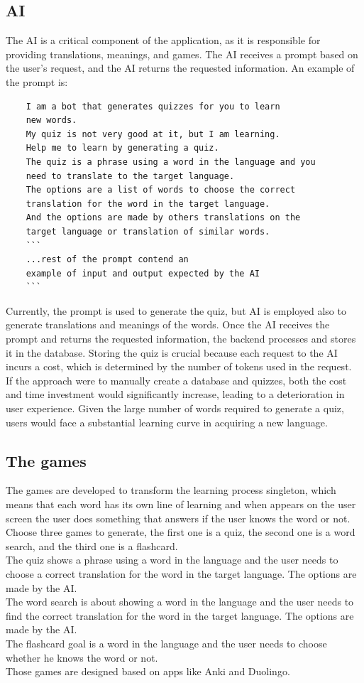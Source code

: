 \documentclass[12pt]{article}
\begin{document}
\subsection{AI}
  The AI is a critical component of the application, as it is responsible for providing translations, meanings, and games. The AI receives a prompt based on the user's request, and the AI returns the requested information. 
  An example of the prompt is: \\
  \begin{verbatim}
    I am a bot that generates quizzes for you to learn 
    new words. 
    My quiz is not very good at it, but I am learning.
    Help me to learn by generating a quiz.
    The quiz is a phrase using a word in the language and you 
    need to translate to the target language.
    The options are a list of words to choose the correct 
    translation for the word in the target language. 
    And the options are made by others translations on the 
    target language or translation of similar words.
    ```
    ...rest of the prompt contend an 
    example of input and output expected by the AI
    ```
  \end{verbatim}
  Currently, the prompt is used to generate the quiz, but AI is employed also to generate translations and meanings of the words. Once the AI receives the prompt and returns the requested information, the backend processes and stores it in the database. Storing the quiz is crucial because each request to the AI incurs a cost, which is determined by the number of tokens used in the request. \\
  If the approach were to manually create a database and quizzes, both the cost and time investment would significantly increase, leading to a deterioration in user experience. Given the large number of words required to generate a quiz, users would face a substantial learning curve in acquiring a new language.

\subsection{The games}
  The games are developed to transform the learning process singleton, which means that each word has its own line of learning and when appears on the user screen the user does something that answers if the user knows the word or not. \\
  Choose three games to generate, the first one is a quiz, the second one is a word search, and the third one is a flashcard. \\
  The quiz shows a phrase using a word in the language and the user needs to choose a correct translation for the word in the target language. The options are made by the AI. \\
  The word search is about showing a word in the language and the user needs to find the correct translation for the word in the target language. The options are made by the AI. \\
  The flashcard goal is  a word in the language and the user needs to choose whether he knows the word or not. \\
  Those games are designed based on apps like Anki and Duolingo.
\end{document}
